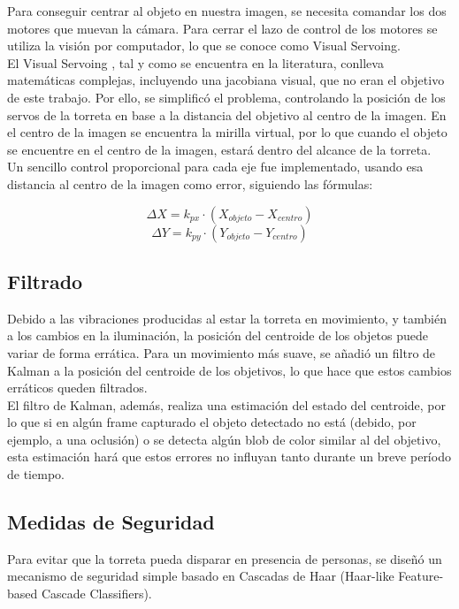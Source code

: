 Para conseguir centrar al objeto en nuestra imagen, se necesita comandar los dos motores que muevan la cámara. Para cerrar el lazo de control de los motores se utiliza la visión por computador, lo que se conoce como Visual Servoing.\\

El Visual Servoing , tal y como se encuentra en la literatura, conlleva matemáticas complejas, incluyendo una jacobiana visual, que no eran el objetivo de este trabajo. Por ello, se simplificó el problema, controlando la posición de los servos de la torreta en base a la distancia del objetivo al centro de la imagen. En el centro de la imagen se encuentra la mirilla virtual, por lo que cuando el objeto se encuentre en el centro de la imagen, estará dentro del alcance de la torreta.\\

Un sencillo control proporcional para cada eje fue implementado, usando esa distancia al centro de la imagen como error, siguiendo las fórmulas:

\[\Delta X=k_{px} \cdot (X_{objeto}-X_{centro})\] 
\[\Delta Y=k_{py} \cdot (Y_{objeto}-Y_{centro})\]

\subsection{Filtrado}
Debido a las vibraciones producidas al estar la torreta en movimiento, y también a los cambios en la iluminación, la posición del centroide de los objetos puede variar de forma errática. Para un movimiento más suave, se añadió un filtro de Kalman a la posición del centroide de los objetivos, lo que hace que estos cambios erráticos queden filtrados.\\

El filtro de Kalman, además, realiza una estimación del estado del centroide, por lo que si en algún frame capturado el objeto detectado no está (debido, por ejemplo, a una oclusión) o se detecta algún blob de color similar al del objetivo, esta estimación hará que estos errores no influyan tanto durante un breve período de tiempo.\\

\subsection{Medidas de Seguridad}
Para evitar que la torreta pueda disparar en presencia de personas, se diseñó un mecanismo de seguridad simple basado en Cascadas de Haar (Haar-like Feature-based Cascade Classifiers).\\

